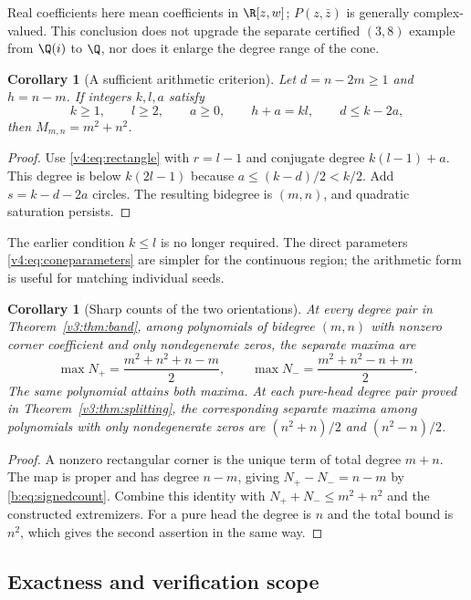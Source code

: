 \documentclass[UTF8,11pt]{ctexart}
\newtheorem{cor}[thm]{Corollary}
\theoremstyle{definition}
\numberwithin{equation}{section}
\begin{document}
Real coefficients here mean coefficients in $\R[z,w]$;
$P(z,\bar z)$ is generally complex-valued. This conclusion does
not upgrade the separate certified $(3,8)$ example from $\Q(i)$
to $\Q$, nor does it enlarge the degree range of the cone.

\begin{cor}[A sufficient arithmetic criterion]\label{v3:cor:arithmetic}
Let $d=n-2m\ge1$ and $h=n-m$. If integers $k,l,a$ satisfy
\begin{equation}\label{v3:eq:arithmetic}
 k\ge1,\qquad l\ge2,\qquad a\ge0,\qquad
 h+a=kl,\qquad d\le k-2a,
\end{equation}
then $M_{m,n}=m^2+n^2$.
\end{cor}
\begin{proof}
Use \eqref{v4:eq:rectangle} with $r=l-1$ and conjugate degree
$k(l-1)+a$. This degree is below $k(2l-1)$ because
$a\le(k-d)/2<k/2$. Add $s=k-d-2a$ circles.
The resulting bidegree is $(m,n)$, and quadratic saturation persists.
\end{proof}
The earlier condition $k\le l$ is no longer required. The direct
parameters \eqref{v4:eq:coneparameters} are simpler for the continuous
region; the arithmetic form is useful for matching individual seeds.

\begin{cor}[Sharp counts of the two orientations]\label{v4:cor:signs}
At every degree pair in Theorem~\ref{v3:thm:band}, among polynomials
of bidegree $(m,n)$ with nonzero corner coefficient and only
nondegenerate zeros, the separate maxima are
\[
 \max N_+=\frac{m^2+n^2+n-m}{2},\qquad
 \max N_-=\frac{m^2+n^2-n+m}{2}.
\]
The same polynomial attains both maxima. At each pure-head degree pair
proved in Theorem~\ref{v3:thm:splitting}, the corresponding separate
maxima among polynomials with only nondegenerate zeros are
$(n^2+n)/2$ and $(n^2-n)/2$.
\end{cor}
\begin{proof}
A nonzero rectangular corner is the unique term of total degree $m+n$.
The map is proper and has degree $n-m$, giving
$N_+-N_-=n-m$ by \eqref{b:eq:signedcount}.
Combine this identity with $N_++N_-\le m^2+n^2$ and the constructed
extremizers. For a pure head the degree is $n$ and the total bound
is $n^2$, which gives the second assertion in the same way.
\end{proof}

\subsection{Exactness and verification scope}
\end{document}
